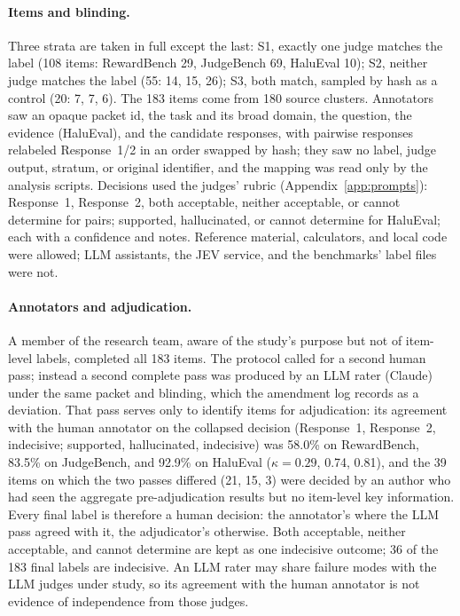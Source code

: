 \documentclass[11pt]{article}
\begin{document}
\paragraph{Items and blinding.}
Three strata are taken in full except the last: S1, exactly one judge matches the label (108 items: RewardBench 29, JudgeBench 69, HaluEval 10); S2, neither judge matches the label (55: 14, 15, 26); S3, both match, sampled by hash as a control (20: 7, 7, 6). The 183 items come from 180 source clusters. Annotators saw an opaque packet id, the task and its broad domain, the question, the evidence (HaluEval), and the candidate responses, with pairwise responses relabeled Response~1/2 in an order swapped by hash; they saw no label, judge output, stratum, or original identifier, and the mapping was read only by the analysis scripts. Decisions used the judges' rubric (Appendix~\ref{app:prompts}): Response~1, Response~2, both acceptable, neither acceptable, or cannot determine for pairs; supported, hallucinated, or cannot determine for HaluEval; each with a confidence and notes. Reference material, calculators, and local code were allowed; LLM assistants, the JEV service, and the benchmarks' label files were not.

\paragraph{Annotators and adjudication.}
A member of the research team, aware of the study's purpose but not of item-level labels, completed all 183 items. The protocol called for a second human pass; instead a second complete pass was produced by an LLM rater (Claude) under the same packet and blinding, which the amendment log records as a deviation. That pass serves only to identify items for adjudication: its agreement with the human annotator on the collapsed decision (Response~1, Response~2, indecisive; supported, hallucinated, indecisive) was 58.0\% on RewardBench, 83.5\% on JudgeBench, and 92.9\% on HaluEval ($\kappa=0.29$, 0.74, 0.81), and the 39 items on which the two passes differed (21, 15, 3) were decided by an author who had seen the aggregate pre-adjudication results but no item-level key information. Every final label is therefore a human decision: the annotator's where the LLM pass agreed with it, the adjudicator's otherwise. Both acceptable, neither acceptable, and cannot determine are kept as one indecisive outcome; 36 of the 183 final labels are indecisive. An LLM rater may share failure modes with the LLM judges under study, so its agreement with the human annotator is not evidence of independence from those judges.
\end{document}
